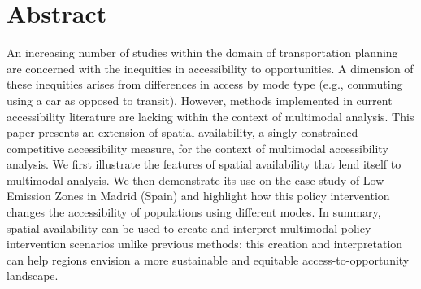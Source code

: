 \documentclass[10pt,letterpaper]{article}
\newcommand{\getIndex}[2]{
  \ForEach{,}{\IfEq{#1}{\thislevelitem}{\number\thislevelcount\ExitForEach}{}}{#2}
}
\newcommand{\getAff}[1]{
  \getIndex{#1}{}
}
\begin{document}
\vspace*{0.2in}


\section*{Abstract}
An increasing number of studies within the domain of transportation
planning are concerned with the inequities in accessibility to
opportunities. A dimension of these inequities arises from differences
in access by mode type (e.g., commuting using a car as opposed to
transit). However, methods implemented in current accessibility
literature are lacking within the context of multimodal analysis. This
paper presents an extension of spatial availability, a
singly-constrained competitive accessibility measure, for the context of
multimodal accessibility analysis. We first illustrate the features of
spatial availability that lend itself to multimodal analysis. We then
demonstrate its use on the case study of Low Emission Zones in Madrid
(Spain) and highlight how this policy intervention changes the
accessibility of populations using different modes. In summary, spatial
availability can be used to create and interpret multimodal policy
intervention scenarios unlike previous methods: this creation and
interpretation can help regions envision a more sustainable and
equitable access-to-opportunity landscape.
\end{document}

